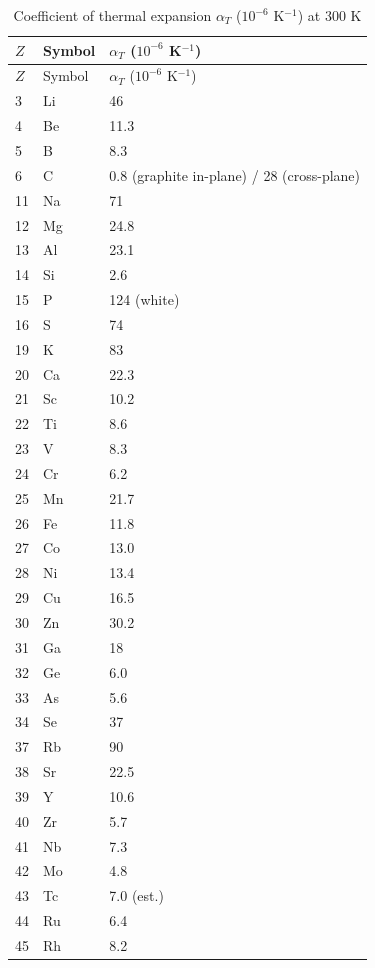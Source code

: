 \documentclass[12pt,a4paper]{article}
\begin{document}
	\begin{longtable}{p{0.6cm}p{1.2cm}p{1.5cm}}
		\caption{Coefficient of thermal expansion $\alpha_T$ ($10^{-6}$ K$^{-1}$) at 300 K} \label{tab:thermal-expansion-all} \\
		\toprule
		$Z$ & Symbol & $\alpha_T$ ($10^{-6}$ K$^{-1}$) \\
		\midrule
		\endfirsthead
		\toprule
		$Z$ & Symbol & $\alpha_T$ ($10^{-6}$ K$^{-1}$) \\
		\midrule
		\endhead
		3  & Li & 46 \\
		4  & Be & 11.3 \\
		5  & B  & 8.3 \\
		6  & C  & 0.8 (graphite in-plane) / 28 (cross-plane) \\
		11 & Na & 71 \\
		12 & Mg & 24.8 \\
		13 & Al & 23.1 \\
		14 & Si & 2.6 \\
		15 & P  & 124 (white) \\
		16 & S  & 74 \\
		19 & K  & 83 \\
		20 & Ca & 22.3 \\
		21 & Sc & 10.2 \\
		22 & Ti & 8.6 \\
		23 & V  & 8.3 \\
		24 & Cr & 6.2 \\
		25 & Mn & 21.7 \\
		26 & Fe & 11.8 \\
		27 & Co & 13.0 \\
		28 & Ni & 13.4 \\
		29 & Cu & 16.5 \\
		30 & Zn & 30.2 \\
		31 & Ga & 18 \\
		32 & Ge & 6.0 \\
		33 & As & 5.6 \\
		34 & Se & 37 \\
		37 & Rb & 90 \\
		38 & Sr & 22.5 \\
		39 & Y  & 10.6 \\
		40 & Zr & 5.7 \\
		41 & Nb & 7.3 \\
		42 & Mo & 4.8 \\
		43 & Tc & 7.0 (est.) \\
		44 & Ru & 6.4 \\
		45 & Rh & 8.2 \\

\end{longtable}
\end{document}
